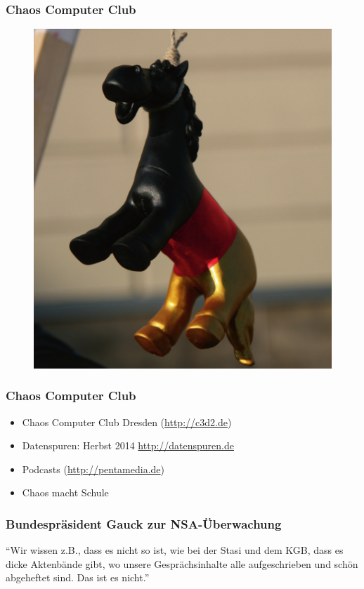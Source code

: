 \documentclass[12pt]{beamer}
\begin{document}
\begin{frame}
  \frametitle{Chaos Computer Club}
  \begin{figure}
    \includegraphics[height=0.7\textheight]{img/trojaner.jpg}
  \end{figure}
\end{frame}

\begin{frame}
    \frametitle{Chaos Computer Club}
    \begin{itemize}
      \item<1-> Chaos Computer Club Dresden (\url{http://c3d2.de})
          \note{}
      \item<2-> Datenspuren: Herbst 2014 \url{http://datenspuren.de}
      \item<3-> Podcasts (\url{http://pentamedia.de})
      \item<4-> Chaos macht Schule
    \end{itemize}
\end{frame}

\begin{frame}
    \frametitle{Bundespräsident Gauck zur NSA-Überwachung}
    \begin{center}
      "`Wir wissen z.B., dass es nicht so ist, wie bei der Stasi und dem KGB, dass es dicke Aktenbände gibt, wo unsere Gesprächsinhalte alle aufgeschrieben und schön abgeheftet sind. Das ist es nicht."'
      \end{center}
\end{frame}
\end{document}
